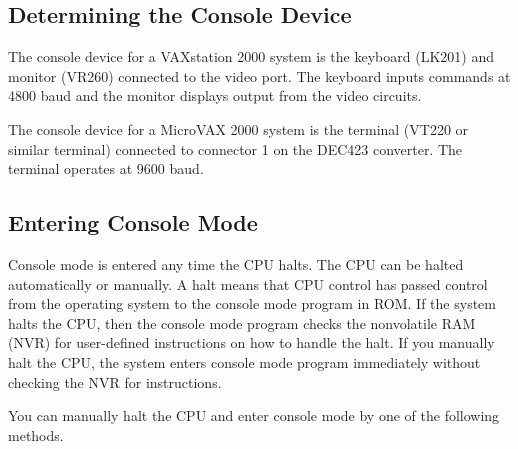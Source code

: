 \documentclass{decsectional}
\begin{document}
\subsection{Determining the Console Device}

The console device for a VAXstation 2000 system is the keyboard (LK201)
and monitor (VR260) connected to the video port. The keyboard inputs
commands at 4800 baud and the monitor displays output from the video
circuits.

The console device for a MicroVAX 2000 system is the terminal (VT220 or
similar terminal) connected to connector 1 on the DEC423 converter. The
terminal operates at 9600 baud.

\subsection{Entering Console Mode}

Console mode is entered any time the CPU halts. The CPU can be halted
automatically or manually. A halt means that CPU control has passed 
control from the operating system to the console mode program in ROM. If
the system halts the CPU, then the console mode program checks the 
nonvolatile RAM (NVR) for user-defined instructions on how to handle the halt.
If you manually halt the CPU, the system enters console mode program 
immediately without checking the NVR for instructions.

You can manually halt the CPU and enter console mode by one of the
following methods.
\end{document}
